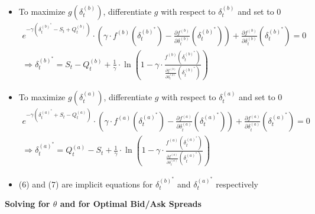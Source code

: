 \documentclass[10pt]{article}
\begin{document}
\begin{itemize} 
    \item To maximize $g\left(\delta_{t}^{(b)}\right)$, differentiate $g$ with respect to $\delta_{t}^{(b)}$ and set to 0
    \[
    \begin{array}{c}
    e^{-\gamma\left(\delta_{t}^{(b)^{*}}-S_{t}+Q_{t}^{(b)}\right)} \cdot\left(\gamma \cdot f^{(b)}\left(\delta_{t}^{(b)^{*}}\right)-\frac{\partial f^{(b)}}{\partial \delta_{t}^{(b)}}\left(\delta_{t}^{(b)^{*}}\right)\right)+\frac{\partial f^{(b)}}{\partial \delta_{t}^{(b)}}\left(\delta_{t}^{(b)^{*}}\right)=0 \\
    \Rightarrow \delta_{t}^{(b)^{*}}=S_{t}-Q_{t}^{(b)}+\frac{1}{\gamma} \cdot \ln \left(1-\gamma \cdot \frac{f^{(b)}\left(\delta_{t}^{(b)^{*}}\right)}{\frac{\partial f^{(b)}}{\partial \delta_{t}^{(b)}}\left(\delta_{t}^{(b)^{*}}\right)}\right)
    \end{array} \tag{6}
    \]
    \item To maximize $g\left(\delta_{t}^{(a)}\right)$, differentiate $g$ with respect to $\delta_{t}^{(a)}$ and set to 0
    \[
    \begin{array}{c}
    e^{-\gamma\left(\delta_{t}^{(a)^{*}}+S_{t}-Q_{t}^{(a)}\right)} \cdot\left(\gamma \cdot f^{(a)}\left(\delta_{t}^{(a)^{*}}\right)-\frac{\partial f^{(a)}}{\partial \delta_{t}^{(a)}}\left(\delta_{t}^{(a)^{*}}\right)\right)+\frac{\partial f^{(a)}}{\partial \delta_{t}^{(a)}}\left(\delta_{t}^{(a)^{*}}\right)=0 \\
    \Rightarrow \delta_{t}^{(a)^{*}}=Q_{t}^{(a)}-S_{t}+\frac{1}{\gamma} \cdot \ln \left(1-\gamma \cdot \frac{f^{(a)}\left(\delta_{t}^{(a)^{*}}\right)}{\frac{\partial f^{(a)}}{\partial \delta_{t}^{(a)}}\left(\delta_{t}^{(a)^{*}}\right)}\right)
    \end{array} \tag{7}
    \]
    \item (6) and (7) are implicit equations for $\delta_{t}^{(b)^{*}}$ and $\delta_{t}^{(a)^{*}}$ respectively
\end{itemize}

\textbf{Solving for $\theta$ and for Optimal Bid/Ask Spreads}
\end{document}
